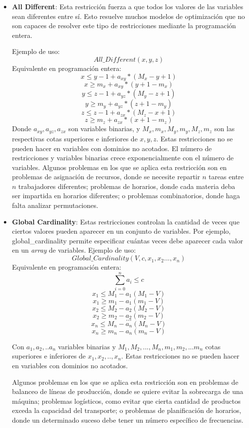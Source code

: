 \documentclass[12pt]{report}
\begin{document}
\begin{itemize}
    \item \textbf{All Different}: Esta restricción fuerza a que todos los valores de las variables sean diferentes entre sí. Esto resuelve muchos modelos de optimización que no son capaces de resolver este tipo de restricciones mediante la programación entera.
    
    Ejemplo de uso:
    $$All\_Different(x,y,z)$$
    Equivalente en programación entera:
    $$x\leq y-1+a_{xy}*(M_x-y+1)$$
    $$x\geq m_x+a_{xy}*(y+1-m_x)$$
    $$y\leq z-1+a_{yz}*(M_y-z+1)$$
    $$y\geq m_y+a_{yz}*(z+1-m_y)$$
    $$z\leq z-1+a_{zx}*(M_z-x+1)$$
    $$z\geq m_z+a_{zx}*(x+1-m_z)$$
    Donde $a_{xy},a_{yz},a_{zx}$ son variables binarias, y $M_x,m_x,M_y,m_y,M_z,m_z$ son las respectivas cotas superiores e inferiores de $x,y,z$. Estas restricciones no se pueden hacer en variables con dominios no acotados. El número de restricciones y variables binarias crece exponencialmente con el número de variables.
    Algunos problemas en los que se aplica esta restricción son en problemas de asignación de recursos, donde se necesite repartir $n$ tareas entre $n$ trabajadores diferentes; problemas de horarios, donde cada materia deba ser impartida en horarios diferentes; o problemas combinatorios, donde haga falta analizar permutaciones.\\
    
    \item \textbf{Global Cardinality}: Estas restricciones controlan la cantidad de veces que ciertos valores pueden aparecer en un conjunto de variables. Por ejemplo, global\_cardinality permite especificar cuántas veces debe aparecer cada valor en un \textit{array} de variables.
    Ejemplo de uso:
    $$Global\_Cardinality(V,c,x_1,x_2...,x_n)$$
    Equivalente en programación entera:
    $$\sum^n_{i=0} a_i \leq c$$
    $$x_1\leq M_1 - a_1(M_1-V)$$
    $$x_1\geq m_1 - a_1(m_1-V)$$
    $$x_2\leq M_2 - a_2(M_2-V)$$
    $$x_2\geq m_2 - a_2(m_2-V)$$
    $$...$$    
    $$x_n\leq M_n - a_n(M_n-V)$$
    $$x_n\geq m_n - a_n(m_n-V)$$

    Con $a_1,a_2,..a_n$ variables binarias y $M_1,M_2,...,M_n,m_1,m_2,...m_n$ cotas superiores e inferiores de $x_1,x_2,..,x_n$. Estas restricciones no se pueden hacer en variables con dominios no acotados.

    Algunos problemas en los que se aplica esta restricción son en problemas de balanceo de líneas de producción, donde se quiere evitar la sobrecarga de una máquina; problemas logísticos, como evitar que cierta cantidad de productos exceda la capacidad del transporte; o problemas de planificación de horarios, donde un determinado suceso debe tener un número específico de frecuencias.\\
    

\end{itemize}
\end{document}
